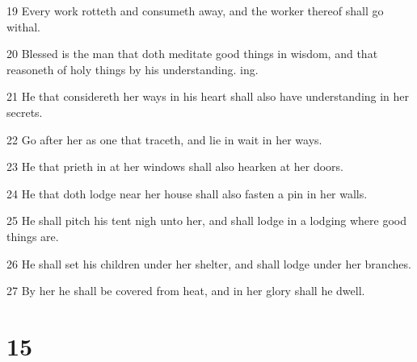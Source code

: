 \par 19 Every work rotteth and consumeth away, and the worker thereof shall go withal.
\par 20 Blessed is the man that doth meditate good things in wisdom, and that reasoneth of holy things by his understanding. ing.
\par 21 He that considereth her ways in his heart shall also have understanding in her secrets.
\par 22 Go after her as one that traceth, and lie in wait in her ways.
\par 23 He that prieth in at her windows shall also hearken at her doors.
\par 24 He that doth lodge near her house shall also fasten a pin in her walls.
\par 25 He shall pitch his tent nigh unto her, and shall lodge in a lodging where good things are.
\par 26 He shall set his children under her shelter, and shall lodge under her branches.
\par 27 By her he shall be covered from heat, and in her glory shall he dwell.

\chapter{15}

